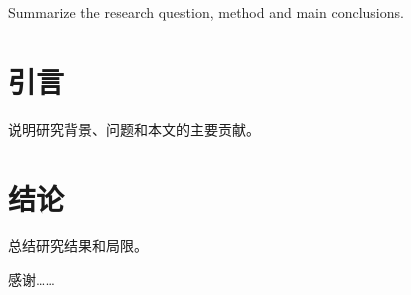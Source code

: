 \documentclass[degree=master]{ustcthesis}
\begin{document}
\maketitle
\declarationoforiginality

\frontmatter
\begin{abstract}
  概括论文的研究问题、方法和主要结论。
\end{abstract}

\begin{abstract*}
  Summarize the research question, method and main conclusions.
\end{abstract*}

\tableofcontents

\mainmatter
\chapter{引言}
说明研究背景、问题和本文的主要贡献。

\chapter{结论}
总结研究结果和局限。



\backmatter
\begin{acknowledgments}
  感谢……
\end{acknowledgments}
\end{document}
